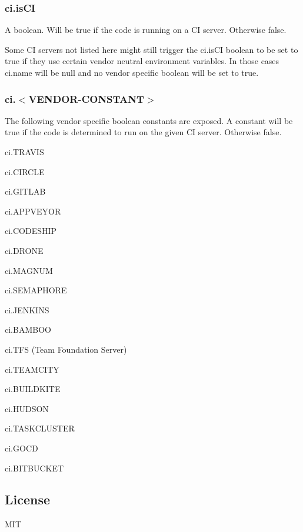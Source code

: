 \subsubsection*{{\ttfamily ci.\+is\+CI}}

A boolean. Will be {\ttfamily true} if the code is running on a CI server. Otherwise {\ttfamily false}.

Some CI servers not listed here might still trigger the {\ttfamily ci.\+is\+CI} boolean to be set to {\ttfamily true} if they use certain vendor neutral environment variables. In those cases {\ttfamily ci.\+name} will be {\ttfamily null} and no vendor specific boolean will be set to {\ttfamily true}.

\subsubsection*{{\ttfamily ci.$<$V\+E\+N\+D\+O\+R-\/\+C\+O\+N\+S\+T\+A\+NT$>$}}

The following vendor specific boolean constants are exposed. A constant will be {\ttfamily true} if the code is determined to run on the given CI server. Otherwise {\ttfamily false}.


\begin{DoxyItemize}
\item {\ttfamily ci.\+T\+R\+A\+V\+IS}
\item {\ttfamily ci.\+C\+I\+R\+C\+LE}
\item {\ttfamily ci.\+G\+I\+T\+L\+AB}
\item {\ttfamily ci.\+A\+P\+P\+V\+E\+Y\+OR}
\item {\ttfamily ci.\+C\+O\+D\+E\+S\+H\+IP}
\item {\ttfamily ci.\+D\+R\+O\+NE}
\item {\ttfamily ci.\+M\+A\+G\+N\+UM}
\item {\ttfamily ci.\+S\+E\+M\+A\+P\+H\+O\+RE}
\item {\ttfamily ci.\+J\+E\+N\+K\+I\+NS}
\item {\ttfamily ci.\+B\+A\+M\+B\+OO}
\item {\ttfamily ci.\+T\+FS} (Team Foundation Server)
\item {\ttfamily ci.\+T\+E\+A\+M\+C\+I\+TY}
\item {\ttfamily ci.\+B\+U\+I\+L\+D\+K\+I\+TE}
\item {\ttfamily ci.\+H\+U\+D\+S\+ON}
\item {\ttfamily ci.\+T\+A\+S\+K\+C\+L\+U\+S\+T\+ER}
\item {\ttfamily ci.\+G\+O\+CD}
\item {\ttfamily ci.\+B\+I\+T\+B\+U\+C\+K\+ET}
\end{DoxyItemize}

\subsection*{License}

M\+IT 